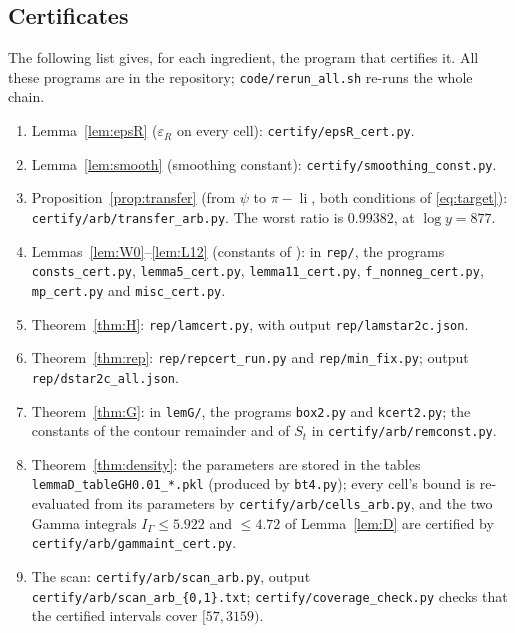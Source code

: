\documentclass[11pt]{amsart}
\numberwithin{equation}{section}
\theoremstyle{definition}
\theoremstyle{remark}
\newcommand{\li}{\operatorname{li}}
\newcommand{\eps}{\varepsilon}
\newcommand{\code}[1]{\texttt{#1}}
\begin{document}
\subsection{Certificates}
The following list gives, for each ingredient, the program that certifies it.
All these programs are in the repository; \code{code/rerun\_all.sh} re-runs the whole chain.
\begin{enumerate}
\item Lemma~\ref{lem:epsR} ($\eps_R$ on every cell): \code{certify/epsR\_cert.py}.
\item Lemma~\ref{lem:smooth} (smoothing constant): \code{certify/smoothing\_const.py}.
\item Proposition~\ref{prop:transfer} (from $\psi$ to $\pi - \li$, both conditions of \eqref{eq:target}): \code{certify/arb/transfer\_arb.py}.
  The worst ratio is $0.99382$, at $\log y = 877$.
\item Lemmas~\ref{lem:W0}--\ref{lem:L12} (constants of \cite{BTY}): in \code{rep/}, the programs \code{consts\_cert.py}, \code{lemma5\_cert.py}, \code{lemma11\_cert.py}, \code{f\_nonneg\_cert.py}, \code{mp\_cert.py} and \code{misc\_cert.py}.
\item Theorem~\ref{thm:H}: \code{rep/lamcert.py}, with output \code{rep/lamstar2c.json}.
\item Theorem~\ref{thm:rep}: \code{rep/repcert\_run.py} and \code{rep/min\_fix.py}; output \code{rep/dstar2c\_all.json}.
\item Theorem~\ref{thm:G}: in \code{lemG/}, the programs \code{box2.py} and \code{kcert2.py}; the constants of the contour remainder and of $S_t$ in \code{certify/arb/remconst.py}.
\item Theorem~\ref{thm:density}: the parameters are stored in the tables \code{lemmaD\_tableGH0.01\_*.pkl} (produced by \code{bt4.py}); every cell's bound is re-evaluated from its parameters by \code{certify/arb/cells\_arb.py}, and the two Gamma integrals $I_\Gamma \le 5.922$ and $\le 4.72$ of Lemma~\ref{lem:D} are certified by \code{certify/arb/gammaint\_cert.py}.
\item The scan: \code{certify/arb/scan\_arb.py}, output \code{certify/arb/scan\_arb\_\{0,1\}.txt}; \code{certify/coverage\_check.py} checks that the certified intervals cover $[57,3159)$.
\end{enumerate}
\end{document}

